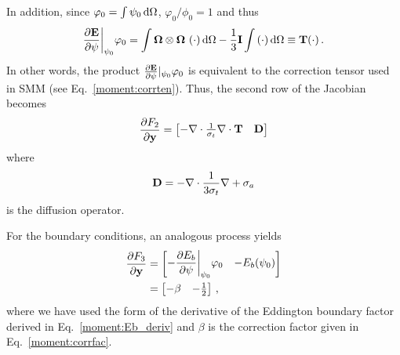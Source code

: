 \documentclass[../doc.tex]{subfiles}
\begin{document}
In addition, since $\varphi_0 = \int \psi_0 \mathop{}\!\mathrm{d} \Omega$, $\varphi_0/\phi_0 = 1$ and thus  
	\begin{equation}
		\frac{\partial \boldsymbol{\mathrm{E}}}{\partial \psi}\biggr\rvert_{\psi_0} \varphi_0 = \int \boldsymbol{\Omega}\otimes\boldsymbol{\Omega}\, \left( \cdot \right)\mathop{}\!\mathrm{d}\Omega  - \frac{1}{3}\boldsymbol{\mathrm{I}} \int \left( \cdot \right)\mathop{}\!\mathrm{d}\Omega \equiv \boldsymbol{\mathrm{T}}(\cdot) \,. 
	\end{equation}
In other words, the product $\frac{\partial \boldsymbol{\mathrm{E}}}{\partial \psi}|_{\psi_0}\varphi_0$ is equivalent to the correction tensor used in SMM (see Eq.~\ref{moment:corrten}). Thus, the second row of the Jacobian becomes
	\begin{equation}
		\frac{\partial F_2}{\partial \boldsymbol{\mathrm{y}}} = \begin{bmatrix} 
			-\nabla\cdot\frac{1}{\sigma_t}\nabla\cdot\boldsymbol{\mathrm{T}} & \boldsymbol{\mathrm{D}} 
		\end{bmatrix}
	\end{equation}
where 
	\begin{equation} \label{moment:diff_op}
		\boldsymbol{\mathrm{D}} = -\nabla\cdot\frac{1}{3\sigma_t}\nabla + \sigma_a
	\end{equation}
is the diffusion operator. 

For the boundary conditions, an analogous process yields
	\begin{equation}
	\begin{aligned}
		\frac{\partial F_3}{\partial \boldsymbol{\mathrm{y}}} &= \begin{bmatrix} 
			\displaystyle-\frac{\partial E_b}{\partial \psi}\biggr\rvert_{\psi_0} \varphi_0 & -E_b(\psi_0) 
		\end{bmatrix} \\
		&= \begin{bmatrix} 
			-\beta & -\frac{1}{2} 
		\end{bmatrix} \,,
	\end{aligned}
	\end{equation}
where we have used the form of the derivative of the Eddington boundary factor derived in Eq.~\ref{moment:Eb_deriv} and $\beta$ is the correction factor given in Eq.~\ref{moment:corrfac}. 
\end{document}
